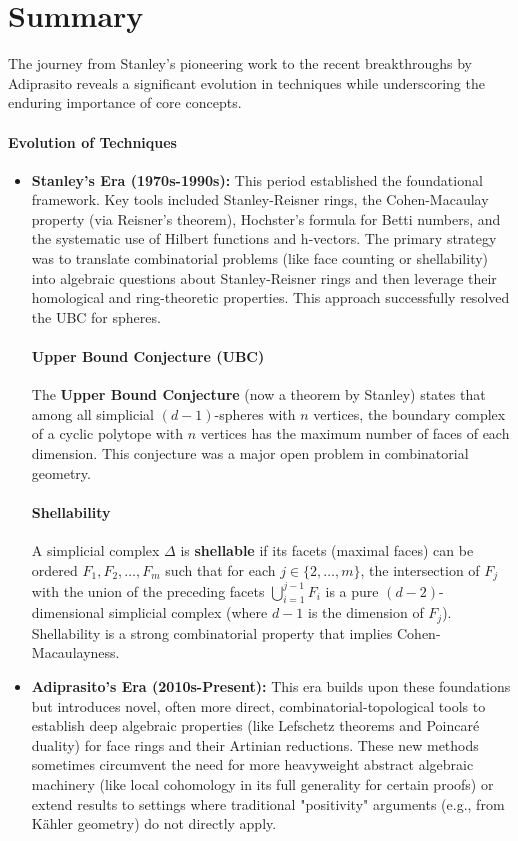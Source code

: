 \documentclass[12pt]{article}
\theoremstyle{definition}
\numberwithin{equation}{subsection}
\begin{document}
\section*{Summary}
The journey from Stanley's pioneering work to the recent breakthroughs by Adiprasito reveals a significant evolution in techniques while underscoring the enduring importance of core concepts.

\paragraph{Evolution of Techniques}
\begin{itemize}
\item \textbf{Stanley's Era (1970s-1990s):} This period established the foundational framework. Key tools included Stanley-Reisner rings, the Cohen-Macaulay property (via Reisner's theorem), Hochster's formula for Betti numbers, and the systematic use of Hilbert functions and h-vectors. The primary strategy was to translate combinatorial problems (like face counting or shellability) into algebraic questions about Stanley-Reisner rings and then leverage their homological and ring-theoretic properties. This approach successfully resolved the UBC for spheres.

\paragraph{Upper Bound Conjecture (UBC)}
The \textbf{Upper Bound Conjecture} (now a theorem by Stanley) states that among all simplicial $(d-1)$-spheres with $n$ vertices, the boundary complex of a cyclic polytope with $n$ vertices has the maximum number of faces of each dimension. This conjecture was a major open problem in combinatorial geometry.

\paragraph{Shellability}
A simplicial complex $\Delta$ is \textbf{shellable} if its facets (maximal faces) can be ordered $F_1, F_2, \ldots, F_m$ such that for each $j \in \{2, \ldots, m\}$, the intersection of $F_j$ with the union of the preceding facets $\bigcup_{i=1}^{j-1} F_i$ is a pure $(d-2)$-dimensional simplicial complex (where $d-1$ is the dimension of $F_j$). Shellability is a strong combinatorial property that implies Cohen-Macaulayness.

\item \textbf{Adiprasito's Era (2010s-Present):} This era builds upon these foundations but introduces novel, often more direct, combinatorial-topological tools to establish deep algebraic properties (like Lefschetz theorems and Poincaré duality) for face rings and their Artinian reductions. These new methods sometimes circumvent the need for more heavyweight abstract algebraic machinery (like local cohomology in its full generality for certain proofs) or extend results to settings where traditional "positivity" arguments (e.g., from Kähler geometry) do not directly apply.
\end{itemize}
\end{document}
